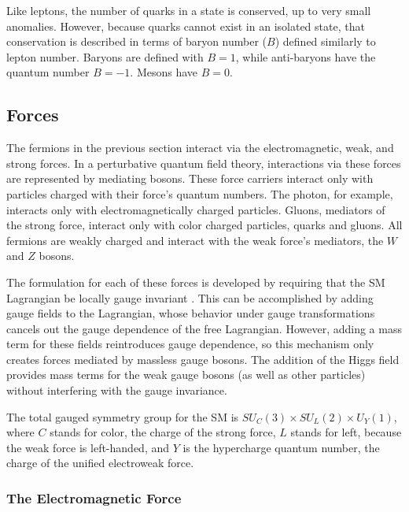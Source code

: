 Like leptons, the number of quarks in a state is conserved, up to very small anomalies. However, because quarks cannot exist in an isolated state, that conservation is described in terms of baryon number ($B$) defined similarly to lepton number. Baryons are defined with $B=1$, while anti-baryons have the quantum number $B=-1$. Mesons have $B = 0$. 

\subsection{Forces}

The fermions in the previous section interact via the electromagnetic, weak, and strong forces. In a perturbative quantum field theory, interactions via these forces are represented by mediating bosons. These force carriers interact only with particles charged with their  force's quantum numbers. The photon, for example, interacts only with electromagnetically charged particles. Gluons, mediators of the strong force, interact only with color charged particles, quarks and gluons. All fermions are weakly charged and interact with the weak force's mediators, the $W$ and $Z$ bosons. 

The formulation for each of these forces is developed by requiring that the \ac{SM} Lagrangian be locally gauge invariant \cite{Griffiths:111880}. This can be accomplished by adding gauge fields to the Lagrangian, whose behavior under gauge transformations cancels out the gauge dependence of the free Lagrangian. However, adding a mass term for these fields reintroduces gauge dependence, so this mechanism only creates forces mediated by massless gauge bosons. The addition of the Higgs field provides mass terms for the weak gauge bosons (as well as other particles) without interfering with the gauge invariance. 

The total gauged symmetry group for the \ac{SM} is $SU_C(3) \times SU_L(2) \times U_Y(1)$, where $C$ stands for color, the charge of the strong force, $L$ stands for left, because the weak force is left-handed, and $Y$ is the hypercharge quantum number, the charge of the unified electroweak force. 



\subsubsection{The Electromagnetic Force}
\label{sec:em}

